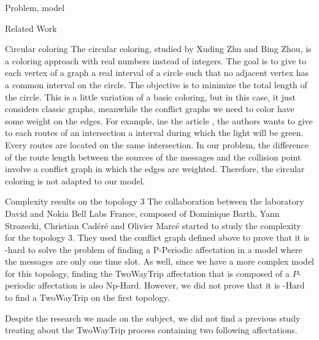 \documentclass[a4paper,10pt]{report}
\begin{document}
\begin{chapter}{Problem, model}
\begin{section}{Related Work}
\begin{subsection}{Circular coloring}
 The circular coloring, studied by Xuding Zhu\cite{zhu2006recent}\cite{zhu2001circular} and Bing Zhou\cite{zhou2013multiple},
 is a coloring approach with real numbers instead of integers. The goal is to give to each vertex of a graph 
 a real interval of a circle such that no adjacent vertex has a common interval on the circle. The objective is to minimize the total length of the circle. This is a little variation of a
 basic coloring, but in this case, it just considers classic graphs, meanwhile the conflict graphs we need to color have some weight
 on the edges.
 For example, ine the article \cite{zhu2001circular}, the authors wants to give to each routes of an intersection a interval during which the light will be green. Every routes are located on the same intersection. In our problem, the difference of the route length between the sources of the messages and the collision point involve a conflict graph in which the edges are weighted.
 Therefore, the circular coloring is not adapted to our model.

\end{subsection}

\begin{subsection}{Complexity results on the topology 3}
 The collaboration between the laboratory David and Nokia Bell Labs France, composed of Dominique Barth, Yann Strozecki, Christian Cadéré and Olivier Marcé started to study the complexity for the topology 3.
 They used the conflict graph defined above to prove that it is \NP-hard to solve the problem of finding a P-Periodic affectation in a model where the
 messages are only one time slot. As well, since we have a more complex model for this topology, finding the TwoWayTrip affectation
 that is composed of a $P$-periodic affectation is also Np-Hard. However, we did not prove that it is \NP-Hard to find
 a TwoWayTrip on the first topology.
\end{subsection}

 \end{section}

Despite the research we made on the subject, we did not find a previous study treating about the TwoWayTrip process containing two 
following affectations.
\end{chapter}
\end{document}
